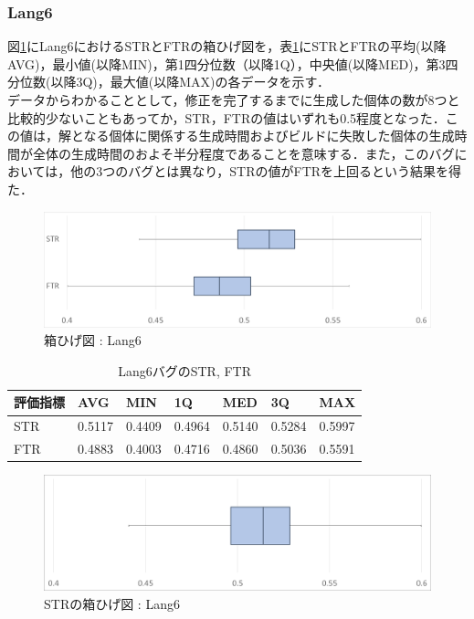 \documentclass[uplatex,dvipdfmx,a4paper]{jsarticle}
\begin{document}
\subsubsection{Lang6}
図\ref{fig:Lang6_boxplot}にLang6におけるSTRとFTRの箱ひげ図を，表\ref{tab:Lang6}にSTRとFTRの平均(以降AVG)，最小値(以降MIN)，第1四分位数（以降1Q），中央値(以降MED)，第3四分位数(以降3Q)，最大値(以降MAX)の各データを示す．\\
データからわかることとして，修正を完了するまでに生成した個体の数が8つと比較的少ないこともあってか，STR，FTRの値はいずれも0.5程度となった．この値は，解となる個体に関係する生成時間およびビルドに失敗した個体の生成時間が全体の生成時間のおよそ半分程度であることを意味する．また，このバグにおいては，他の3つのバグとは異なり，STRの値がFTRを上回るという結果を得た．
\begin{figure}[t]
  \centering
  \includegraphics[width=\linewidth]{fig/Lang6_boxplot.png}
  \caption{箱ひげ図 : Lang6}
  \label{fig:Lang6_boxplot}
\end{figure}
\begin{table}[b]
  \centering
  \caption{Lang6バグのSTR, FTR}
  \label{tab:Lang6}
  \begin{tabular}{l|llllll} \hline\hline
    評価指標 & AVG         & MIN & 1Q & MED & 3Q & MAX   \\\hline
    STR & 0.5117 & 0.4409 & 0.4964 & 0.5140 & 0.5284 & 0.5997  \\
    FTR & 0.4883 & 0.4003 & 0.4716 & 0.4860 & 0.5036 & 0.5591 \\\hline\hline
  \end{tabular}
\end{table}
\begin{figure}[t]
  \centering
  \includegraphics[width=\linewidth]{fig/Lang6_boxplot_STR.png}
  \caption{STRの箱ひげ図 : Lang6}
  \label{fig:Lang6_boxplot_STR}
\end{figure}
\end{document}
